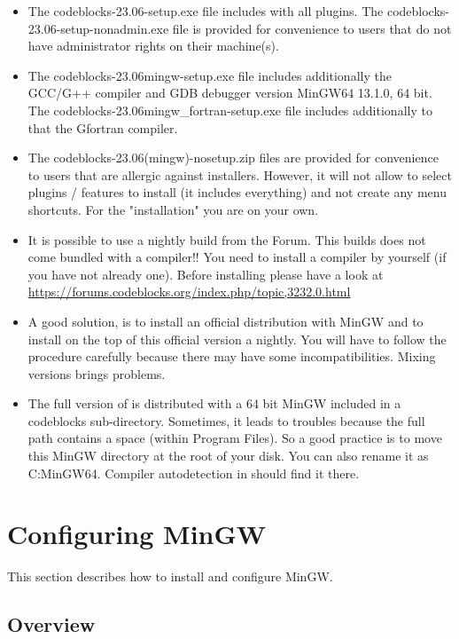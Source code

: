 \begin{itemize}
\item The codeblocks-23.06-setup.exe file includes \codeblocks with all plugins. The codeblocks-23.06-setup-nonadmin.exe file is provided for convenience to users that do not have administrator rights on their machine(s).
\item The codeblocks-23.06mingw-setup.exe file includes additionally the GCC/G++ compiler and GDB debugger version MinGW64 13.1.0, 64 bit. The codeblocks-23.06mingw\_fortran-setup.exe file includes additionally to that the Gfortran compiler.
\item The codeblocks-23.06(mingw)-nosetup.zip files are provided for convenience to users that are allergic against installers. However, it will not allow to select plugins / features to install (it includes everything) and not create any menu shortcuts. For the "installation" you are on your own.
\item It is possible to use a nightly build from the Forum. This builds does not come bundled with a compiler!! You need to install a compiler by yourself (if you have not already one). Before installing please have a look at \url{https://forums.codeblocks.org/index.php/topic,3232.0.html} 
\item A good solution, is to install an official distribution with MinGW and to install on the top of this official version a nightly. You will have to follow the procedure carefully because there may have some incompatibilities. Mixing versions brings problems. 
\item The full version of \codeblocks is distributed with a 64 bit MinGW included in a codeblocks sub-directory. Sometimes, it leads to troubles because the full path contains a space (within Program Files). So a good practice is to move this MinGW directory at the root of your disk. You can also rename it as C:\osp MinGW64. Compiler autodetection in \codeblocks should find it there.
\end{itemize}

\section{Configuring MinGW}

This section describes how to install and configure MinGW.

\subsection{Overview}

